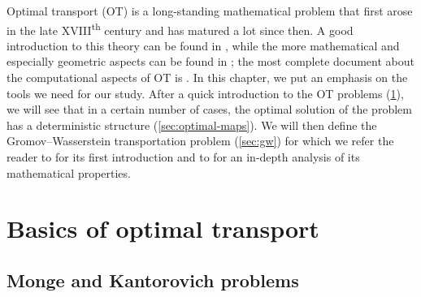 \label{chap:ot}
Optimal transport (OT) is a long-standing mathematical problem that first arose in the late \textsc{XVIII}\textsuperscript{th} century \cite{monge1781memoire} and has matured a lot since then. A good introduction to this theory can be found in \cite{santambrogio2015optimal}, while the more mathematical and especially geometric aspects can be found in \cite{villani2009optimal}; the most complete document about the computational aspects of OT is \cite{peyre2019computational}. In this chapter, we put an emphasis on the tools we need for our study. After a quick introduction to the OT problems (\cref{sec:basics-ot}), we will see that in a certain number of cases, the optimal solution of the problem has a deterministic structure (\cref{sec:optimal-maps}). We will then define the Gromov--Wasserstein transportation problem (\cref{sec:gw}) for which we refer the reader to \cite{memoli2011gromov} for its first introduction and to \cite{sturm2012space} for an in-depth analysis of its mathematical properties.

\section{Basics of optimal transport}
    \label{sec:basics-ot}
    \subsection{Monge and Kantorovich problems}


